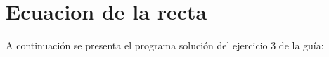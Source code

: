 \section{Ecuacion de la recta}

  A continuación se presenta el programa solución
  del ejercicio 3 de la guía:
  
  